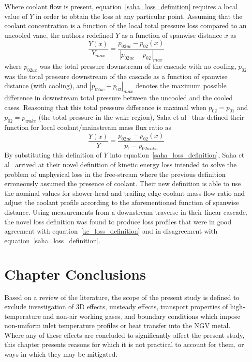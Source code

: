 \documentclass[a4paper, 11pt, oneside]{report}
\begin{document}
Where coolant flow is present, equation~\ref{saha_loss_definition} requires a local value of $Y$ in order to obtain the loss at any particular point. Assuming that the coolant concentration is a function of the local total pressure loss compared to an uncooled vane, the authors redefined $Y$ as a function of spanwise distance $x$ as
\begin{equation}
\frac{Y\left(x\right)}{Y_{max}}
=
\frac{
	p_{02uc} - p_{02}\left(x\right)
}{
	\left| p_{02uc} - p_{02} \right|_{max}
}
\end{equation}
where $p_{02uc}$ was the total pressure downstream of the cascade with no cooling, $p_{02}$ was the total pressure downstream of the cascade as a function of spanwise distance (with cooling), and $\left| p_{02uc} - p_{02} \right|_{max}$ denotes the maximum possible difference in downstream total pressure between the uncooled and the cooled cases. Reasoning that this total pressure difference is maximal when $p_{02}=p_{01}$ and $p_{02}=p_{wake}$ (the total pressure in the wake region), Saha et al~\cite{saha_loss} thus defined their function for local coolant/mainstream mass flux ratio as
\begin{equation}
\frac{Y\left(x\right)}{Y}
=
\frac{
	p_{02uc} - p_{02}\left(x\right)
}{
	p_1 - p_{02wake}
}
\end{equation}
By substituting this definition of $Y$ into equation~\ref{saha_loss_definition}, Saha et al~\cite{saha_loss} arrived at their novel definition of kinetic energy loss intended to solve the problem of unphysical loss in the free-stream where the previous definition erroneously assumed the presence of coolant. Their new definition is able to use the nominal values for shower-head and trailing edge coolant mass flow ratio and adjust the coolant profile according to the aforementioned function of spanwise distance. Using measurements from a downstream traverse in their linear cascade, the novel loss definition was found to produce loss profiles that were in good agreement with equation~\ref{ke_loss_definition} and in disagreement with equation~\ref{saha_loss_definition}.

\section{Chapter Conclusions}

Based on a review of the literature, the scope of the present study is defined to exclude investigation of 3D effects, unsteady effects, transport properties of high-temperature and non-air working gases, and boundary conditions which impose non-uniform inlet temperature profiles or heat transfer into the NGV metal. Where any of these effects are concluded to significantly affect the present study, this chapter presents reasons for which it is not practical to account for them, or ways in which they may be mitigated.
\end{document}
